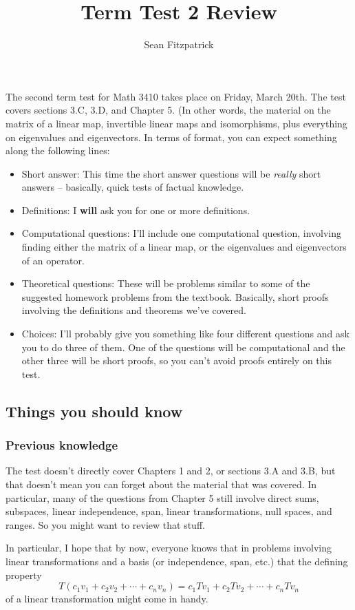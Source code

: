 \documentclass[12pt,letterpaper]{article}
\author{Sean Fitzpatrick}
\title{Term Test 2 Review}
\begin{document}
\maketitle

The second term test for Math 3410 takes place on Friday, March 20th. The test covers sections 3.C, 3.D, and Chapter 5. (In other words, the material on the matrix of a linear map,  invertible linear maps and isomorphisms, plus everything on eigenvalues and eigenvectors.  In terms of format, you can expect something along the following lines:
\begin{itemize}
\item Short answer: This time the short answer questions will be {\em really} short answers -- basically, quick tests of factual knowledge.
\item Definitions: I {\bf will} ask you for one or more definitions. 
\item Computational questions: I'll include one computational question, involving finding either the matrix of a linear map, or the eigenvalues and eigenvectors of an operator.
\item Theoretical questions: These will be problems similar to some of the suggested homework problems from the textbook. Basically, short proofs involving the definitions and theorems we've covered.
\item Choices: I'll probably give you something like four different questions and ask you to do three of them. One of the questions will be computational and the other three will be short proofs, so you can't avoid proofs entirely on this test.
\end{itemize}
\subsection*{Things you should know}
\subsubsection*{Previous knowledge}
The test doesn't directly cover Chapters 1 and 2, or sections 3.A and 3.B, but that doesn't mean you can forget about the material that was covered. In particular, many of the questions from Chapter 5 still involve direct sums, subspaces, linear independence, span, linear transformations, null spaces, and ranges. So you might want to review that stuff.

In particular, I hope that by now, everyone knows that in problems involving linear transformations and a basis (or independence, span, etc.) that the defining property
\[
 T(c_1v_1+c_2v_2+\cdots +c_nv_n) = c_1Tv_1+c_2Tv_2+\cdots +c_nTv_n
\]
of a linear transformation might come in handy.
\newpage
\end{document}
